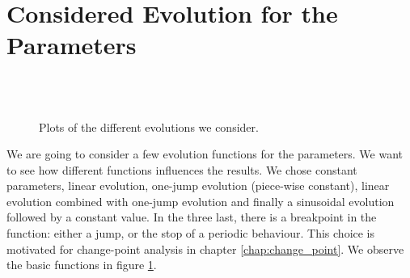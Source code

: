 \documentclass[11pt]{book}
\begin{document}
\section{Considered Evolution for the Parameters}
\begin{figure}
\centering
{}
\\
\\
\caption{Plots of the different evolutions we consider.}
\label{fig:evol_functions}
\end{figure}

We are going to consider a few evolution functions for the parameters. We want to see how different functions influences the results. We chose constant parameters, linear evolution, one-jump evolution (piece-wise constant), linear evolution combined with one-jump evolution and finally a sinusoidal evolution followed by a constant value. In the three last, there is a breakpoint in the function: either a jump, or the stop of a periodic behaviour. This choice is motivated for change-point analysis in 
chapter \ref{chap:change_point}. We observe the basic functions in figure \ref{fig:evol_functions}.
\end{document}
